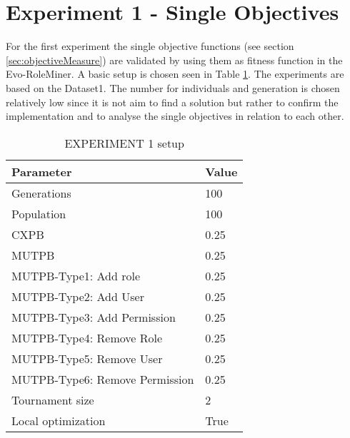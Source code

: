 \section{Experiment 1 - Single Objectives}
\label{sec:exp1}
For the first experiment the single objective functions (see section \ref{sec:objectiveMeasure}) are validated by using them as fitness function in the Evo-RoleMiner. A basic setup is chosen seen in Table \ref{tab:exp1_setup}. The experiments are based on the Dataset1. The number for individuals and generation is chosen relatively low since it is not aim to find a solution but rather to confirm the implementation and to analyse the single objectives in relation to each other.

\begin{table}[H]
    \centering
    \begin{adjustbox}{width=0.5\textwidth}
	    \begin{tabular}{|l|l|}
	        \hline
	        \rowcolor{gray!25} 
	        \textbf{Parameter}              & \textbf{Value}    \\ \hline
	        Generations                     & 100              \\ \hline
	        Population                      & 100              \\ \hline
	        CXPB                            & 0.25              \\ \hline
	        MUTPB                           & 0.25              \\ \hline
	        MUTPB-Type1: Add role           & 0.25              \\ \hline
	        MUTPB-Type2: Add User           & 0.25              \\ \hline
	        MUTPB-Type3: Add Permission     & 0.25              \\ \hline
	        MUTPB-Type4: Remove Role        & 0.25              \\ \hline
	        MUTPB-Type5: Remove User        & 0.25              \\ \hline
	        MUTPB-Type6: Remove Permission  & 0.25              \\ \hline
	        Tournament size                 & 2                 \\ \hline
	        Local optimization              & True              \\ \hline
	    \end{tabular}
	\end{adjustbox}
    \caption{EXPERIMENT 1 setup}
    \label{tab:exp1_setup}
\end{table}

